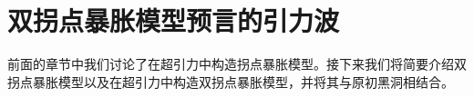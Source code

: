 \chapter{双拐点暴胀模型预言的引力波}

前面的章节中我们讨论了在超引力中构造拐点暴胀模型。接下来我们将简要介绍双拐点暴胀模型以及在超引力中构造双拐点暴胀模型，并将其与原初黑洞相结合。



% 

